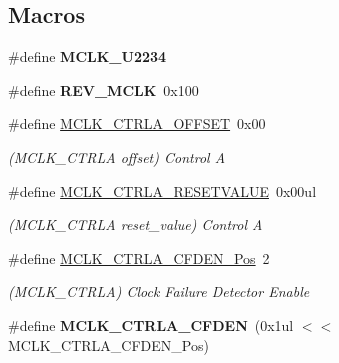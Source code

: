 \subsection*{Macros}
\begin{DoxyCompactItemize}
\item 
\hypertarget{group___s_a_m_l21___m_c_l_k_ga5e52a9862cf025deca5d1a6ca3549955}{}\#define {\bfseries M\+C\+L\+K\+\_\+\+U2234}\label{group___s_a_m_l21___m_c_l_k_ga5e52a9862cf025deca5d1a6ca3549955}

\item 
\hypertarget{group___s_a_m_l21___m_c_l_k_ga33a5fe449cc0952da1f6a4c4479bdb61}{}\#define {\bfseries R\+E\+V\+\_\+\+M\+C\+L\+K}~0x100\label{group___s_a_m_l21___m_c_l_k_ga33a5fe449cc0952da1f6a4c4479bdb61}

\item 
\hypertarget{group___s_a_m_l21___m_c_l_k_ga8b444ecb081c2c293fb934c6a50eb8d7}{}\#define \hyperlink{group___s_a_m_l21___m_c_l_k_ga8b444ecb081c2c293fb934c6a50eb8d7}{M\+C\+L\+K\+\_\+\+C\+T\+R\+L\+A\+\_\+\+O\+F\+F\+S\+E\+T}~0x00\label{group___s_a_m_l21___m_c_l_k_ga8b444ecb081c2c293fb934c6a50eb8d7}

\begin{DoxyCompactList}\small\item\em (M\+C\+L\+K\+\_\+\+C\+T\+R\+L\+A offset) Control A \end{DoxyCompactList}\item 
\hypertarget{group___s_a_m_l21___m_c_l_k_gaa689c46b5cf92061710a29001d45239a}{}\#define \hyperlink{group___s_a_m_l21___m_c_l_k_gaa689c46b5cf92061710a29001d45239a}{M\+C\+L\+K\+\_\+\+C\+T\+R\+L\+A\+\_\+\+R\+E\+S\+E\+T\+V\+A\+L\+U\+E}~0x00ul\label{group___s_a_m_l21___m_c_l_k_gaa689c46b5cf92061710a29001d45239a}

\begin{DoxyCompactList}\small\item\em (M\+C\+L\+K\+\_\+\+C\+T\+R\+L\+A reset\+\_\+value) Control A \end{DoxyCompactList}\item 
\hypertarget{group___s_a_m_l21___m_c_l_k_ga47050fcd57be7e07aac0902498452817}{}\#define \hyperlink{group___s_a_m_l21___m_c_l_k_ga47050fcd57be7e07aac0902498452817}{M\+C\+L\+K\+\_\+\+C\+T\+R\+L\+A\+\_\+\+C\+F\+D\+E\+N\+\_\+\+Pos}~2\label{group___s_a_m_l21___m_c_l_k_ga47050fcd57be7e07aac0902498452817}

\begin{DoxyCompactList}\small\item\em (M\+C\+L\+K\+\_\+\+C\+T\+R\+L\+A) Clock Failure Detector Enable \end{DoxyCompactList}\item 
\hypertarget{group___s_a_m_l21___m_c_l_k_gab33c4474532dc2a466adf7c9220ab980}{}\#define {\bfseries M\+C\+L\+K\+\_\+\+C\+T\+R\+L\+A\+\_\+\+C\+F\+D\+E\+N}~(0x1ul $<$$<$ M\+C\+L\+K\+\_\+\+C\+T\+R\+L\+A\+\_\+\+C\+F\+D\+E\+N\+\_\+\+Pos)\label{group___s_a_m_l21___m_c_l_k_gab33c4474532dc2a466adf7c9220ab980}


\end{DoxyCompactItemize}
